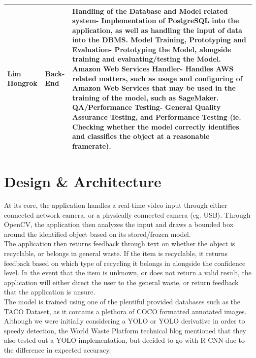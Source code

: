 \documentclass[conference]{IEEEtran}
\begin{document}
\begin{table}[htbp]
\begin{tabular}{|p{1.5cm}|p{1.5cm}|p{4.7cm}|}
Lim Hongrok & Back-End & 
\newline Handling of the Database and Model related system\newline- Implementation of PostgreSQL into the application, as well as handling the input of data into the DBMS.
\newline 
\newline Model Training, Prototyping and Evaluation\newline- Prototyping the Model, alongside training and evaluating/testing the Model.
\newline 
\newline Amazon Web Services Handler\newline- Handles AWS related matters, such as usage and configuring of Amazon Web Services that may be used in the training of the model, such as SageMaker.
\newline 
\newline QA/Performance Testing\newline- General Quality Assurance Testing, and Performance Testing (ie. Checking whether the model correctly identifies and classifies the object at a reasonable framerate).
\\ \hline
\end{tabular}
\end{table}

\newpage

\section{Design \& Architecture}
At its core, the application handles a real-time video input through either connected network camera, or a physically connected camera (eg. USB). Through OpenCV, the application then analyzes the input and draws a bounded box around the identified object based on its stored/frozen model.\\

The application then returns feedback through text on whether the object is recyclable, or belongs in general waste. If the item is recyclable, it returns feedback based on which type of recycling it belongs in alongside the confidence level. In the event that the item is unknown, or does not return a valid result, the application will either direct the user to the general waste, or return feedback that the application is unsure.\\

The model is trained using one of the plentiful provided databases such as the TACO Dataset, as it contains a plethora of COCO formatted annotated images. Although we were initially considering a YOLO or YOLO derivative in order to speedy detection, the World Waste Platform technical blog mentioned that they also tested out a YOLO implementation, but decided to go with R-CNN due to the difference in expected accuracy.\\
\end{document}
